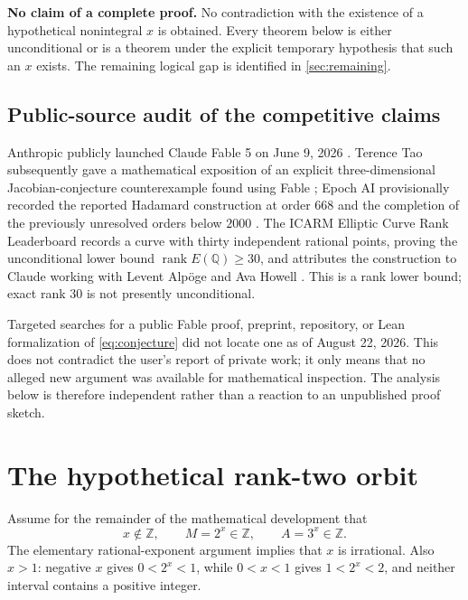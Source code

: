 \documentclass[11pt]{article}
\theoremstyle{definition}
\newcommand{\Z}{\mathbb Z}
\newcommand{\Q}{\mathbb Q}
\begin{document}
\begin{cautionbox}
\textbf{No claim of a complete proof.}
No contradiction with the existence of a hypothetical nonintegral $x$ is
obtained.  Every theorem below is either unconditional or is a theorem under
the explicit temporary hypothesis that such an $x$ exists.  The remaining
logical gap is identified in \cref{sec:remaining}.
\end{cautionbox}

\subsection{Public-source audit of the competitive claims}

Anthropic publicly launched Claude Fable 5 on June 9, 2026
\cite{AnthropicFable2026}.  Terence Tao subsequently gave a mathematical exposition of an explicit
three-dimensional Jacobian-conjecture counterexample found using Fable
\cite{TaoJacobian2026}; Epoch AI provisionally recorded the reported Hadamard
construction at order $668$ and the completion of the previously unresolved
orders below $2000$ \cite{EpochHadamard2026}.  The ICARM Elliptic Curve
Rank Leaderboard records a curve with thirty independent rational points,
proving the unconditional lower bound $\operatorname{rank}E(\Q)\ge30$, and
attributes the construction to Claude working with Levent Alp\"oge and Ava
Howell \cite{ICARMRank2026}.  This is a rank lower bound; exact rank $30$ is
not presently unconditional.

Targeted searches for a public Fable proof, preprint, repository, or Lean
formalization of \eqref{eq:conjecture} did not locate one as of August 22,
2026.  This does not contradict the user's report of private work; it only
means that no alleged new argument was available for mathematical inspection.
The analysis below is therefore independent rather than a reaction to an
unpublished proof sketch.

\section{The hypothetical rank-two orbit}
\label{sec:orbit}

Assume for the remainder of the mathematical development that
\begin{equation}
 x\notin\Z,\qquad M=2^x\in\Z,\qquad A=3^x\in\Z.
 \label{eq:hypothesis}
\end{equation}
The elementary rational-exponent argument implies that $x$ is irrational.
Also $x>1$: negative $x$ gives $0<2^x<1$, while $0<x<1$ gives
$1<2^x<2$, and neither interval contains a positive integer.
\end{document}
